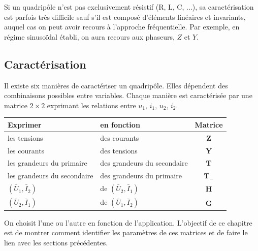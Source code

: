 Si un quadripôle n'est pas exclusivement résistif (R, L, C, ...), sa caractérisation est parfois très difficile sauf s'il est composé d'éléments linéaires et invariants, auquel cas on peut avoir recours à l'approche fréquentielle.
Par exemple, en régime sinusoïdal établi, on aura recours aux phaseurs, $Z$ et $Y$.

\subsection{Caractérisation}
Il existe six manières de caractériser un quadripôle. Elles dépendent des combinaisons possibles entre variables. 
Chaque manière est caractérisée par une matrice $2\times2$ exprimant les relations entre $u_1,\, i_1,\, u_2, \, i_2$.

\begin{center}
	\begin{tabular}{l l | c}
		Exprimer & en fonction & Matrice \\
		\hline
		les tensions & des courants & $\mathbf{Z}$ \\
		les courants & des tensions & $\mathbf{Y}$ \\
		les grandeurs du primaire & des grandeurs du secondaire & $\mathbf{T}$ \\
		les grandeurs du secondaire & des grandeurs du primaire & $\mathbf{T}_-$ \\
		$(\bar{U}_1, \bar{I}_2)$ & de $(\bar{U}_2, \bar{I}_1)$& $\mathbf{H}$ \\
		$(\bar{U}_2, \bar{I}_1)$ & de $(\bar{U}_1, \bar{I}_2)$& $\mathbf{G}$
	\end{tabular}
\end{center}	
On choisit l'une ou l'autre en fonction de l'application. L'objectif de ce chapitre est de montrer comment identifier les paramètres de ces matrices et de faire le lien avec les sections précédentes.


